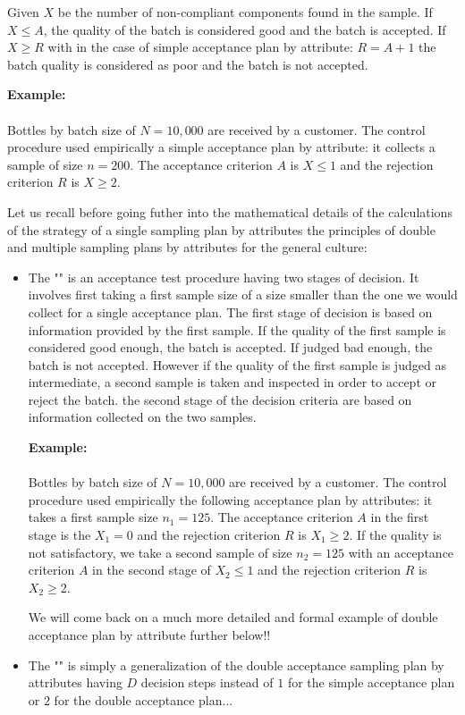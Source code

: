	Given $X$ be the number of non-compliant components found in the sample. If $X\leq A$, the quality of the batch is considered good and the batch is accepted. If $X\geq R$ with in the case of simple acceptance plan by attribute: $R = A+1$ the batch quality is considered as poor and the batch is not accepted.
	\begin{tcolorbox}[colframe=black,colback=white,sharp corners]
	\textbf{{\Large {}}Example:}\\\\
	Bottles by batch size of $N = 10,000$ are received by a customer. The control procedure used empirically a simple acceptance plan by attribute: it collects a sample of size $n = 200$. The acceptance criterion $A$ is $X\leq 1$ and the rejection criterion $R$ is $X\geq 2$.
	\end{tcolorbox}
	Let us recall before going futher into the mathematical details of the calculations of the strategy of a single sampling plan by attributes the principles of double and multiple sampling plans by attributes for the general culture:
	\begin{itemize}
		\item The "" is an acceptance test procedure having two stages of decision. It involves first taking a first sample size of a size smaller  than the one we would collect for a single acceptance plan. The first stage of decision is based on information provided by the first sample. If the quality of the first sample is considered good enough, the batch is accepted. If judged bad enough, the batch is not accepted. However if the quality of the first sample is judged as intermediate, a second sample is taken and inspected in order to accept or reject the batch. the second stage of the decision criteria are based on information collected on the two samples.
		\begin{tcolorbox}[colframe=black,colback=white,sharp corners]
		\textbf{{\Large {}}Example:}\\\\
		Bottles by batch size of $N = 10,000$ are received by a customer. The control procedure used empirically the following acceptance plan by attributes: it takes a first sample size $n_1=125$. The acceptance criterion $A$ in the first stage is the $X_1=0$ and the rejection criterion $R$ is $X_1\geq 2$. If the quality is not satisfactory, we take a second sample of size $n_2=125$ with an acceptance criterion $A$ in the second stage of $X_2\leq 1$ and the rejection criterion $R$ is $X_2\geq 2$.
		\end{tcolorbox}
		We will come back on a much more detailed and formal example of double acceptance plan by attribute further below!!
		
		\item The "" is simply a generalization of the double acceptance sampling plan by attributes having $D$ decision steps instead of $1$ for the simple acceptance plan or $2$ for the double acceptance plan...
	\end{itemize}
